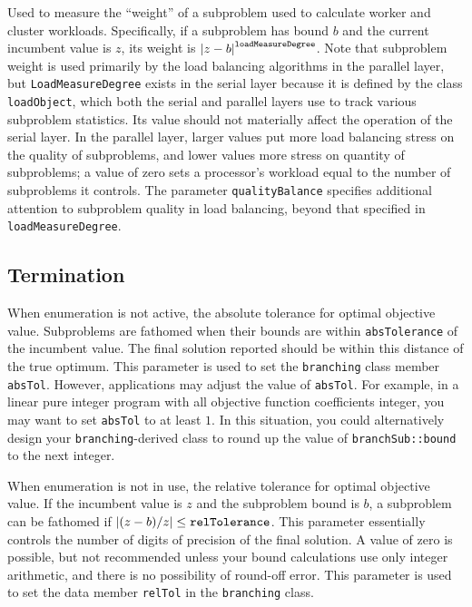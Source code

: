 Used to
measure the ``weight'' of a subproblem used to calculate worker and
cluster workloads.  Specifically, if a subproblem has bound $b$ and
the current incumbent value is $z$, its weight is ${\left|z -
b\right|}^{\text{\texttt{loadMeasureDegree}}}$.  Note that subproblem
weight is used primarily by the load balancing algorithms in the
parallel layer, but \texttt{LoadMeasureDegree} exists in the serial
layer because it is defined by the class \texttt{loadObject}, which
both the serial and parallel layers use to track various subproblem
statistics.  Its value should not materially affect the operation of the serial
layer.  In the parallel layer, larger values put more load balancing
stress on the quality of subproblems, and lower values more stress on
quantity of subproblems; a value of zero sets a processor's workload
equal to the number of subproblems it controls.  The parameter
\texttt{qualityBalance} specifies additional attention to subproblem
quality in load balancing, beyond that specified in
\texttt{loadMeasureDegree}. 


\subsection{Termination}
\vspace{-3ex} 
When enumeration is not active, the absolute
tolerance for optimal objective value.
Subproblems are fathomed when
their bounds are within \texttt{absTolerance} of the incumbent value.
The final solution reported should be within this distance of the true
optimum.  This parameter is used to set the \texttt{branching} class
member \texttt{absTol}.  However, applications may adjust the value
of \texttt{absTol}.  For example, in a linear pure integer program
with all objective function coefficients integer, you may want to set
\texttt{absTol} to at least $1$.  In this situation, you could
alternatively design your \texttt{branching}-derived class to round up
the value of \texttt{branchSub::bound} to the next integer.

When enumeration is not in use, the 
relative tolerance for optimal objective value.  If the incumbent
value is $z$ and the subproblem bound is $b$, a subproblem can be
fathomed if ${\left|(z - b)/z\right|} \leq
\text{\texttt{relTolerance}}$.  This parameter essentially controls the
number of digits of precision of the final solution.  A
value of zero is possible, but not recommended unless your bound
calculations use only integer arithmetic, and there is no possibility
of round-off error.  This parameter is used to set the data member
\texttt{relTol} in the \texttt{branching} class.

